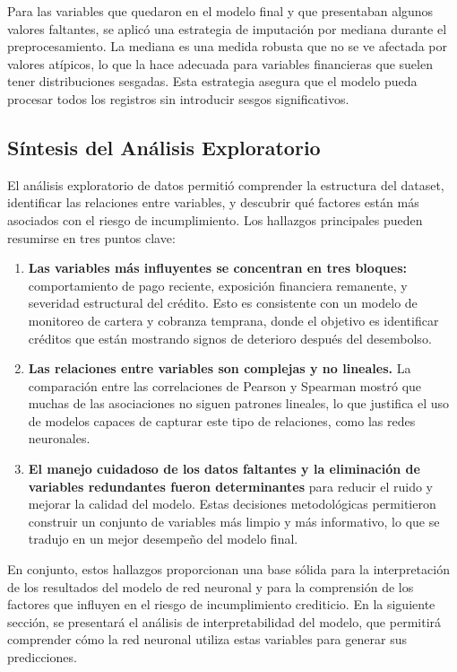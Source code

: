 \documentclass[12pt,a4paper]{article}
\begin{document}
Para las variables que quedaron en el modelo final y que presentaban algunos valores faltantes, se aplicó una estrategia de imputación por mediana durante el preprocesamiento. La mediana es una medida robusta que no se ve afectada por valores atípicos, lo que la hace adecuada para variables financieras que suelen tener distribuciones sesgadas. Esta estrategia asegura que el modelo pueda procesar todos los registros sin introducir sesgos significativos.

\subsection{Síntesis del Análisis Exploratorio}

El análisis exploratorio de datos permitió comprender la estructura del dataset, identificar las relaciones entre variables, y descubrir qué factores están más asociados con el riesgo de incumplimiento. Los hallazgos principales pueden resumirse en tres puntos clave:

\begin{enumerate}
    \item \textbf{Las variables más influyentes se concentran en tres bloques:} comportamiento de pago reciente, exposición financiera remanente, y severidad estructural del crédito. Esto es consistente con un modelo de monitoreo de cartera y cobranza temprana, donde el objetivo es identificar créditos que están mostrando signos de deterioro después del desembolso.
    \item \textbf{Las relaciones entre variables son complejas y no lineales.} La comparación entre las correlaciones de Pearson y Spearman mostró que muchas de las asociaciones no siguen patrones lineales, lo que justifica el uso de modelos capaces de capturar este tipo de relaciones, como las redes neuronales.
    \item \textbf{El manejo cuidadoso de los datos faltantes y la eliminación de variables redundantes fueron determinantes} para reducir el ruido y mejorar la calidad del modelo. Estas decisiones metodológicas permitieron construir un conjunto de variables más limpio y más informativo, lo que se tradujo en un mejor desempeño del modelo final.
\end{enumerate}

En conjunto, estos hallazgos proporcionan una base sólida para la interpretación de los resultados del modelo de red neuronal y para la comprensión de los factores que influyen en el riesgo de incumplimiento crediticio. En la siguiente sección, se presentará el análisis de interpretabilidad del modelo, que permitirá comprender cómo la red neuronal utiliza estas variables para generar sus predicciones.
\end{document}
